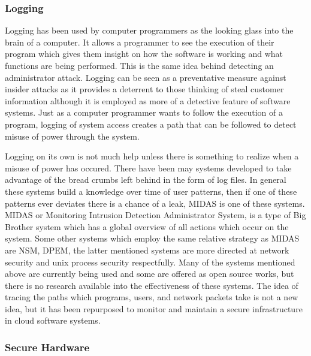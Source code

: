 \subsubsection{Logging}
\label{hlLogging}

Logging has been used by computer programmers as the looking glass into the brain of a computer. It allows a programmer to see the execution of their program which gives them insight on how the software is working and what functions are being performed. This is the same idea behind detecting an administrator attack. Logging can be seen as a preventative measure against insider attacks as it provides a deterrent to those thinking of steal customer information although it is employed as more of a detective feature of software systems.\cite{sirer} Just as a computer programmer wants to follow the execution of a program, logging of system access creates a path that can be followed to detect misuse of power through the system.

Logging on its own is not much help unless there is something to realize when a misuse of power has occured.\cite{althebyan} There have been may systems developed to take advantage of the bread crumbs left behind in the form of log files. In general these systems build a knowledge over time of user patterns, then if one of these patterns ever deviates there is a chance of a leak, MIDAS is one of these systems. MIDAS or Monitoring Intrusion Detection Administrator System, is a type of Big Brother system which has a global overview of all actions which occur on the system.\cite{nguyen} Some other systems which employ the same relative strategy as MIDAS are NSM, DPEM, the latter mentioned systems are more directed at network security and unix process security respectfully. Many of the systems mentioned above are currently being used and some are offered as open source works, but there is no research available into the effectiveness of these systems. The idea of tracing the paths which programs, users, and network packets take is not a new idea, but it has been repurposed to monitor and maintain a secure infrastructure in cloud software systems.\cite{nguyen}\cite{mukherjee}

\subsubsection{Secure Hardware}
\label{hlSecureHW}

